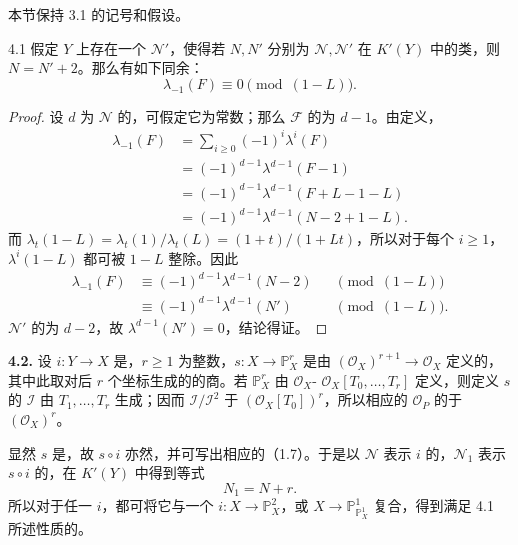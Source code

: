 本节保持 3.1 的记号和假设。
\begin{SGAresult}{}{4.1}
假定 $Y$ 上存在一个 $\mathcal N'$，使得若 $N,N'$ 分别为 $\mathcal N,\mathcal N'$ 在 $K'(Y)$ 中的类，则 $N=N'+2$。那么有如下同余：
\[
\lambda_{-1}(F)\equiv0\pmod{(1-L)}.
\]
\end{SGAresult}
\begin{proof}
设 $d$ 为 $\mathcal N$ 的，可假定它为常数；那么 $\mathcal F$ 的为 $d-1$。由定义，
\[
\begin{aligned}
\lambda_{-1}(F)&=\sum_{i\geq0}(-1)^i\lambda^i(F)\\
&=(-1)^{d-1}\lambda^{d-1}(F-1)\\
&=(-1)^{d-1}\lambda^{d-1}(F+L-1-L)\\
&=(-1)^{d-1}\lambda^{d-1}(N-2+1-L).
\end{aligned}
\]
而 $\lambda_t(1-L)=\lambda_t(1)/\lambda_t(L)=(1+t)/(1+Lt)$，所以对于每个 $i\geq1$，$\lambda^i(1-L)$ 都可被 $1-L$ 整除。因此
\[
\begin{aligned}
\lambda_{-1}(F)&\equiv(-1)^{d-1}\lambda^{d-1}(N-2)&&\pmod{(1-L)}\\
&\equiv(-1)^{d-1}\lambda^{d-1}(N')&&\pmod{(1-L)}.
\end{aligned}
\]
$\mathcal N'$ 的为 $d-2$，故 $\lambda^{d-1}(N')=0$，结论得证。
\end{proof}

\textbf{4.2.} 设 $i:Y\to X$ 是，$r\geq1$ 为整数，$s:X\to\mathbb P_X^r$ 是由 $(\mathcal O_X)^{r+1}\to\mathcal O_X$ 定义的，其中此取对后 $r$ 个坐标生成的的商。若 $\mathbb P_X^r$ 由 $\mathcal O_X$- $\mathcal O_X[T_0,\ldots,T_r]$ 定义，则定义 $s$ 的 $\mathcal I$ 由 $T_1,\ldots,T_r$ 生成；因而 $\mathcal I/\mathcal I^2$ 于 $(\mathcal O_X[T_0])^r$，所以相应的 $\mathcal O_P$ 的于 $(\mathcal O_X)^r$。

显然 $s$ 是，故 $s\circ i$ 亦然，并可写出相应的（1.7）。于是以 $\mathcal N$ 表示 $i$ 的，$\mathcal N_1$ 表示 $s\circ i$ 的，在 $K'(Y)$ 中得到等式
\[
N_1=N+r.
\]
所以对于任一 $i$，都可将它与一个 $i:X\to\mathbb P_X^2$，或 $X\to\mathbb P_{\mathbb P_X^1}^1$ 复合，得到满足 4.1 所述性质的。

